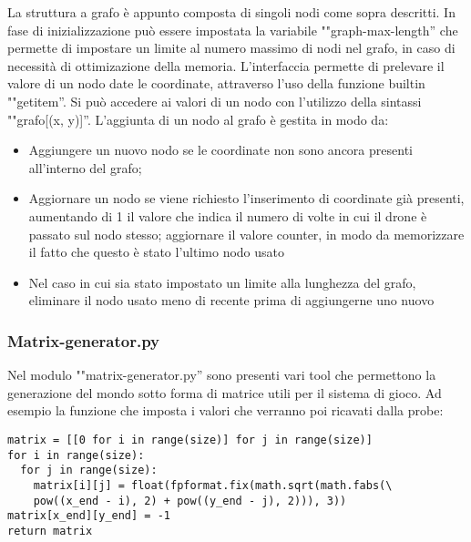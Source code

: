 La struttura a grafo è appunto composta di singoli nodi come sopra descritti. In fase di inizializzazione può essere impostata la variabile ""graph-max-length'' che permette di impostare un limite al numero massimo di nodi nel grafo, in caso di necessità di ottimizazione della memoria. 
L'interfaccia permette di prelevare il valore di un nodo date le coordinate, attraverso l'uso della funzione builtin ""getitem''. Si può accedere ai valori di un nodo con l'utilizzo della sintassi ""grafo[(x, y)]''. L'aggiunta di un nodo al grafo è gestita in modo da:
\begin{itemize}
\item Aggiungere un nuovo nodo se le coordinate non sono ancora presenti all'interno del grafo;

\item Aggiornare un nodo se viene richiesto l'inserimento di coordinate già presenti, aumentando di 1 il valore che indica il numero di volte in cui il drone è passato sul nodo stesso; aggiornare il valore counter, in modo da memorizzare il fatto che questo è stato l'ultimo nodo usato

\item Nel caso in cui sia stato impostato un limite alla lunghezza del grafo, eliminare il nodo usato meno di recente prima di aggiungerne uno nuovo
\end{itemize}
\subsubsection{Matrix-generator.py}
Nel modulo ""matrix-generator.py'' sono presenti vari tool che permettono la generazione del mondo sotto forma di matrice utili per il sistema di gioco. Ad esempio la funzione che imposta i valori che verranno poi ricavati dalla probe:
\begin{verbatim}
matrix = [[0 for i in range(size)] for j in range(size)]
for i in range(size):
  for j in range(size):
    matrix[i][j] = float(fpformat.fix(math.sqrt(math.fabs(\
    pow((x_end - i), 2) + pow((y_end - j), 2))), 3))
matrix[x_end][y_end] = -1
return matrix
\end{verbatim}

